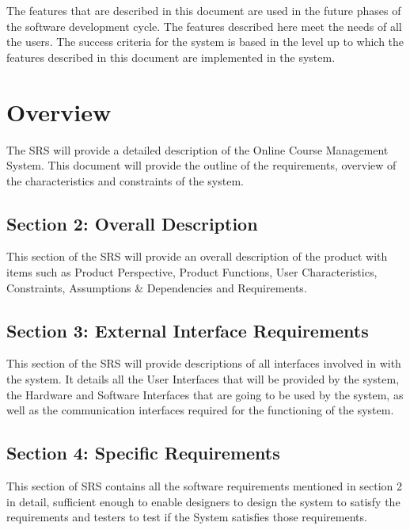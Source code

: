 \documentclass[12pt, a4]{report}
\begin{document}
\begin{flushleft}
The features that are described in this document are used in the future phases of the software development cycle. The features described here meet the needs of all the users. The success criteria for the system is based in the level up to which the features described in this document are implemented in the system.
\end{flushleft}


\newpage
\section{Overview}
The SRS will provide a detailed description of the Online Course Management System. This document will provide the outline of the requirements, overview of the characteristics and constraints of the system.
\subsection{Section 2: Overall Description} This section of the SRS will provide an overall description of the product with items such as Product Perspective, Product Functions, User Characteristics, Constraints, Assumptions \& Dependencies and Requirements.
\subsection{Section 3: External Interface Requirements} This section of the SRS will provide descriptions of all interfaces involved in with the system. It details all the User Interfaces that will be provided by the system, the Hardware and Software Interfaces that are going to be used by the system, as well as the communication interfaces required for the functioning of the system.
\subsection{Section 4: Specific Requirements} This section of SRS contains all the software requirements mentioned in section 2 in detail, sufficient enough to enable designers to design the system to satisfy the requirements and testers to test if the System satisfies those requirements.

\end{document}

